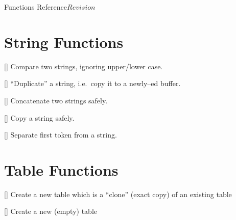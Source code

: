 \begin{cactuspart}{ Functions Reference}{}{$Revision$}
\begin{Lentry}


\end{Lentry}


\section{String Functions}

\begin{Lentry}

\item[\code{Util\_StrCmpi}]
     [\pageref{Util-StrCmpi}]
Compare two strings, ignoring upper/lower case.

\item[\code{Util\_Strdup}]
     [\pageref{Util-Strdup}]
``Duplicate'' a string,
i.e.\ copy it to a newly--ed buffer.

\item[\code{Util\_Strlcat}]
     [\pageref{Util-Strlcat}]
Concatenate two strings safely.

\item[\code{Util\_Strlcpy}]
     [\pageref{Util-Strlcpy}]
Copy a string safely.

\item[\code{Util\_StrSep}]
     [\pageref{Util-StrSep}]
Separate first token from a string.

\end{Lentry}


\section{Table Functions}

\begin{Lentry}

\item[\code{Util\_TableClone}]
     [\pageref{Util-TableClone}]
Create a new table which is a ``clone'' (exact copy) of an existing
table

\item[\code{Util\_TableCreate}]
     [\pageref{Util-TableCreate}]
Create a new (empty) table


\end{Lentry}
\end{cactuspart}
